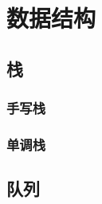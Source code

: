 \chapter{数据结构}\label{ch:data-structure}

\section{栈}\label{sec:stack}

\subsection{手写栈}\label{subsec:handwriting-stack}


\subsection{单调栈}\label{subsec:monotonic-stack}


\section{队列}\label{sec:queue}
